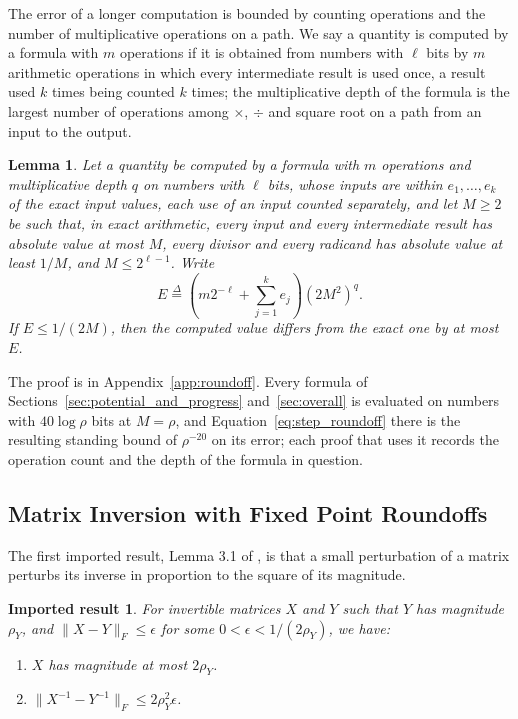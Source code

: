 \documentclass[11pt]{article}
\newtheorem{lemma}{Lemma}[section]
\newtheorem{importedresult}{Imported result}[section]
\newcommand{\defeq}{\stackrel{\Delta}{=}}
\begin{document}
The error of a longer computation is bounded by counting operations and the
number of multiplicative operations on a path.
We say a quantity is computed by a formula with $m$ operations if it is obtained
from numbers with $\ell$ bits by
$m$ arithmetic operations in which every intermediate result is used once, a
result used $k$ times being counted
$k$ times; the multiplicative depth of the formula is the largest number of
operations among $\times$,
$\div$ and square root on a path from an input to the output.

\begin{lemma}
\label{lem:roundoff}
Let a quantity be computed by a formula with $m$ operations and multiplicative
depth $q$ on numbers with
$\ell$ bits, whose inputs are within
$e_1, \ldots, e_k$ of the exact input values, each use of an input counted
separately, and let $M \ge 2$ be such that, in exact arithmetic, every input and
every intermediate result has absolute value at most $M$, every divisor and
every radicand has absolute value at least $1 / M$, and
$M \le 2^{\ell - 1}$.
Write
\[
E
\defeq
\left( m 2^{-\ell} + \sum_{j = 1}^{k} e_j \right)
\left( 2 M^{2} \right)^{q} .
\]
If $E \le 1 / (2 M)$, then the computed value differs from the exact one by at
most $E$.
\end{lemma}

The proof is in Appendix~\ref{app:roundoff}.
Every formula of Sections~\ref{sec:potential_and_progress} and~\ref{sec:overall}
is evaluated on numbers with $40 \log \rho$ bits at
$M = \rho$, and Equation~\eqref{eq:step_roundoff} there is the resulting
standing bound of $\rho^{-20}$ on its error; each proof that uses it records the
operation count and the depth of the formula in question.

\subsection{Matrix Inversion with Fixed Point Roundoffs}
\label{subsec:inverse}

The first imported result, Lemma 3.1 of \cite{GPV23}, is
that a small perturbation of a matrix perturbs its inverse in proportion to the
square of its magnitude.

\begin{importedresult}
\label{imp:perturb}
For invertible matrices $X$ and
$Y$ such that
$Y$ has magnitude
$\rho_Y$, and
$\|X-Y\|_F\le \epsilon$ for some
$0 < \epsilon < 1/(2 \rho_Y)$, we have:
\begin{enumerate}
\item \label{itm:imp_perturb:1} $X$ has magnitude at most
  $2 \rho_Y$.
\item \label{itm:imp_perturb:2} $\|X^{-1}-Y^{-1}\|_F \le 2 \rho_Y^2 \epsilon$.
\end{enumerate}
\end{importedresult}
\end{document}
